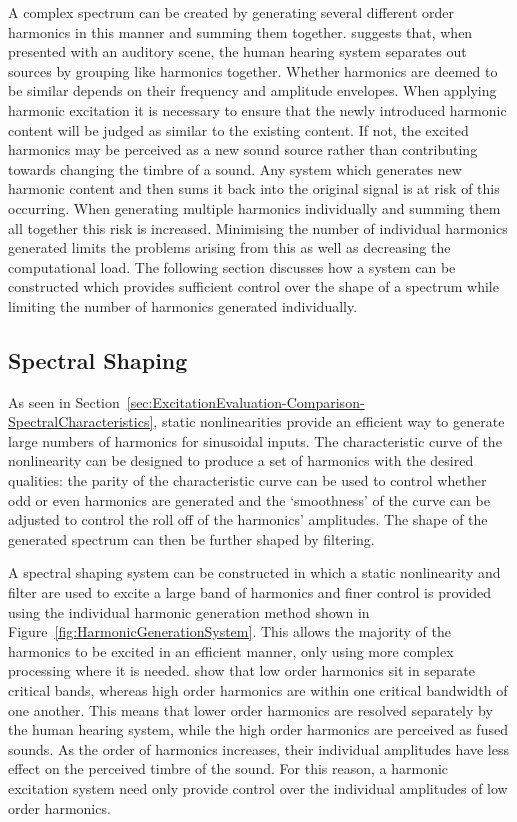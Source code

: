 		A complex spectrum can be created by generating several different order harmonics in this manner and
		summing them together. \citet{bregman1994auditory} suggests that, when presented with an auditory scene,
		the human hearing system separates out sources by grouping like harmonics together. Whether harmonics are
		deemed to be similar depends on their frequency and amplitude envelopes. When applying harmonic excitation
		it is necessary to ensure that the newly introduced harmonic content will be judged as similar to the
		existing content. If not, the excited harmonics may be perceived as a new sound source rather than
		contributing towards changing the timbre of a sound. Any system which generates new harmonic content and
		then sums it back into the original signal is at risk of this occurring. When generating multiple harmonics
		individually and summing them all together this risk is increased. Minimising the number of individual
		harmonics generated limits the problems arising from this as well as decreasing the computational load. The
		following section discusses how a system can be constructed which provides sufficient control over the
		shape of a spectrum while limiting the number of harmonics generated individually.
		
	\subsection{Spectral Shaping}
	\label{sec:FeatureControl-Systems-SpectralShaping}
		As seen in Section~\ref{sec:ExcitationEvaluation-Comparison-SpectralCharacteristics}, static nonlinearities
		provide an efficient way to generate large numbers of harmonics for sinusoidal inputs. The characteristic
		curve of the nonlinearity can be designed to produce a set of harmonics with the desired qualities: the
		parity of the characteristic curve can be used to control whether odd or even harmonics are generated and
		the `smoothness' of the curve can be adjusted to control the roll off of the harmonics' amplitudes. The
		shape of the generated spectrum can then be further shaped by filtering.

		A spectral shaping system can be constructed in which a static nonlinearity and filter are used to excite a
		large band of harmonics and finer control is provided using the individual harmonic generation method shown
		in Figure~\ref{fig:HarmonicGenerationSystem}. This allows the majority of the harmonics to be excited in an
		efficient manner, only using more complex processing where it is needed. \citet{howard2009acoustics} show
		that low order harmonics sit in separate critical bands, whereas high order harmonics are within one
		critical bandwidth of one another. This means that lower order harmonics are resolved separately by the
		human hearing system, while the high order harmonics are perceived as fused sounds. As the order of
		harmonics increases, their individual amplitudes have less effect on the perceived timbre of the sound. For
		this reason, a harmonic excitation system need only provide control over the individual amplitudes of low
		order harmonics. 

